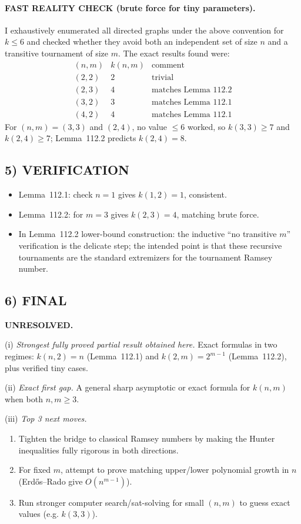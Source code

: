 \paragraph{FAST REALITY CHECK (brute force for tiny parameters).}
I exhaustively enumerated all directed graphs under the above convention for $k\le 6$ and checked whether they avoid both an independent set of size $n$ and a transitive tournament of size $m$.  The exact results found were:
\[
\begin{array}{c|c|c}
(n,m) & k(n,m) & \text{comment}\\\hline
(2,2) & 2 & \text{trivial}\\
(2,3) & 4 & \text{matches Lemma~112.2}\\
(3,2) & 3 & \text{matches Lemma~112.1}\\
(4,2) & 4 & \text{matches Lemma~112.1}
\end{array}
\]
For $(n,m)=(3,3)$ and $(2,4)$, no value $\le 6$ worked, so $k(3,3)\ge 7$ and $k(2,4)\ge 7$; Lemma~112.2 predicts $k(2,4)=8$.

\subsection*{5) VERIFICATION}
\begin{itemize}
\item Lemma~112.1: check $n=1$ gives $k(1,2)=1$, consistent.
\item Lemma~112.2: for $m=3$ gives $k(2,3)=4$, matching brute force.
\item In Lemma~112.2 lower-bound construction: the inductive ``no transitive $m$'' verification is the delicate step; the intended point is that these recursive tournaments are the standard extremizers for the tournament Ramsey number.
\end{itemize}

\subsection*{6) FINAL}
\textbf{UNRESOLVED.}

(i) \emph{Strongest fully proved partial result obtained here.}
Exact formulas in two regimes:
$k(n,2)=n$ (Lemma~112.1) and $k(2,m)=2^{m-1}$ (Lemma~112.2), plus verified tiny cases.

(ii) \emph{Exact first gap.}
A general sharp asymptotic or exact formula for $k(n,m)$ when both $n,m\ge3$.

(iii) \emph{Top 3 next moves.}
\begin{enumerate}
\item Tighten the bridge to classical Ramsey numbers by making the Hunter inequalities fully rigorous in both directions.
\item For fixed $m$, attempt to prove matching upper/lower polynomial growth in $n$ (Erd\H{o}s--Rado give $O(n^{m-1})$).
\item Run stronger computer search/sat-solving for small $(n,m)$ to guess exact values (e.g. $k(3,3)$).
\end{enumerate}

